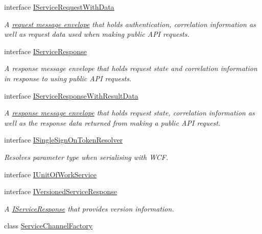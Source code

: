 \begin{DoxyCompactItemize}
interface \hyperlink{interfaceCqrs_1_1Services_1_1IServiceRequestWithData}{I\+Service\+Request\+With\+Data}
\begin{DoxyCompactList}\small\item\em A \hyperlink{}{request message envelope} that holds authentication, correlation information as well as request data used when making public A\+PI requests. \end{DoxyCompactList}\item 
interface \hyperlink{interfaceCqrs_1_1Services_1_1IServiceResponse}{I\+Service\+Response}
\begin{DoxyCompactList}\small\item\em A response message envelope that holds request state and correlation information in response to using public A\+PI requests. \end{DoxyCompactList}\item 
interface \hyperlink{interfaceCqrs_1_1Services_1_1IServiceResponseWithResultData}{I\+Service\+Response\+With\+Result\+Data}
\begin{DoxyCompactList}\small\item\em A \hyperlink{interfaceCqrs_1_1Services_1_1IServiceResponse}{response message envelope} that holds request state, correlation information as well as the response data returned from making a public A\+PI request. \end{DoxyCompactList}\item 
interface \hyperlink{interfaceCqrs_1_1Services_1_1ISingleSignOnTokenResolver}{I\+Single\+Sign\+On\+Token\+Resolver}
\begin{DoxyCompactList}\small\item\em Resolves parameter type when serialising with W\+CF. \end{DoxyCompactList}\item 
interface \hyperlink{interfaceCqrs_1_1Services_1_1IUnitOfWorkService}{I\+Unit\+Of\+Work\+Service}
\item 
interface \hyperlink{interfaceCqrs_1_1Services_1_1IVersionedServiceResponse}{I\+Versioned\+Service\+Response}
\begin{DoxyCompactList}\small\item\em A \hyperlink{interfaceCqrs_1_1Services_1_1IServiceResponse}{I\+Service\+Response} that provides version information. \end{DoxyCompactList}\item 
class \hyperlink{classCqrs_1_1Services_1_1ServiceChannelFactory}{Service\+Channel\+Factory}
\item 

\end{DoxyCompactItemize}
